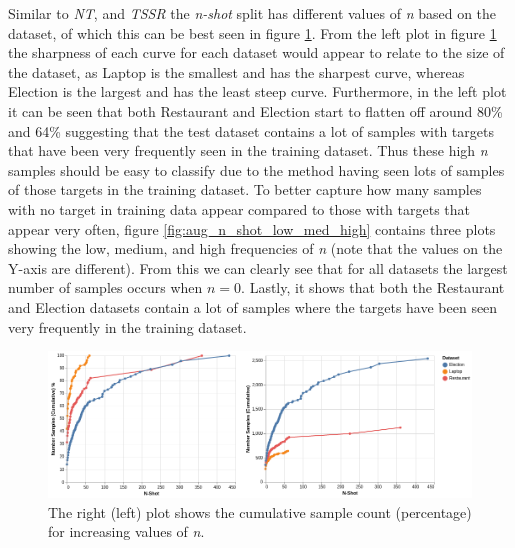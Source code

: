 Similar to \textit{NT}, and \textit{TSSR} the \textit{n-shot} split has different values of \textit{n} based on the dataset, of which this can be best seen in figure \ref{fig:aug_n_shot_cuml}. From the left plot in figure \ref{fig:aug_n_shot_cuml} the sharpness of each curve for each dataset would appear to relate to the size of the dataset, as Laptop is the smallest and has the sharpest curve, whereas Election is the largest and has the least steep curve. Furthermore, in the left plot it can be seen that both Restaurant and Election start to flatten off around 80\% and 64\% suggesting that the test dataset contains a lot of samples with targets that have been very frequently seen in the training dataset. Thus these high \textit{n} samples should be easy to classify due to the method having seen lots of samples of those targets in the training dataset. To better capture how many samples with no target in training data appear compared to those with targets that appear very often, figure \ref{fig:aug_n_shot_low_med_high} contains three plots showing the low, medium, and high frequencies of \textit{n} (note that the values on the Y-axis are different). From this we can clearly see that for all datasets the largest number of samples occurs when $n=0$. Lastly, it shows that both the Restaurant and Election datasets contain a lot of samples where the targets have been seen very frequently in the training dataset.

\begin{figure}[h!]
    \centering
    \includegraphics[scale=0.42]{images/augmentation/error_analysis/n_shot_cuml.png}
    \caption{The right (left) plot shows the cumulative sample count (percentage) for increasing values of \textit{n}.}
    \label{fig:aug_n_shot_cuml}
\end{figure}

